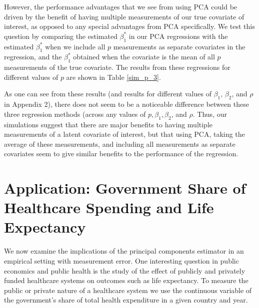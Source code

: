 \documentclass[12pt]{article}
\begin{document}
        However, the performance advantages that we see from using PCA could be driven by the benefit of having multiple measurements of our true covariate of interest, as opposed to any special advantages from PCA specifically. We test this question by comparing the estimated $\beta_1^*$ in our PCA regressions with the estimated $\beta_1^*$ when we include all $p$ measurements as separate covariates in the regression, and the $\beta_1^*$ obtained when the covariate is the mean of all $p$ measurements of the true covariate. The results from these regressions for different values of $p$ are shown in Table \ref{sim_p_3}.

        \clearpage

        

        As one can see from these results (and results for different values of $\beta_1$, $\beta_2$, and $\rho$ in Appendix 2), there does not seem to be a noticeable difference between these three regression methods (across any values of $p, \beta_1,\beta_2$, and $\rho$. Thus, our simulations suggest that there are major benefits to having multiple measurements of a latent covariate of interest, but that using PCA, taking the average of these measurements, and including all measurements as separate covariates seem to give similar benefits to the performance of the regression.


    \section*{Application: Government Share of Healthcare Spending and Life Expectancy}

        We now examine the implications of the principal components estimator in an empirical setting with measurement error. One interesting question in public economics and public health is the study of the effect of publicly and privately funded healthcare systems on outcomes such as life expectancy. To measure the public or private nature of a healthcare system we use the continuous variable of the government's share of total health expenditure in a given country and year.
\end{document}

